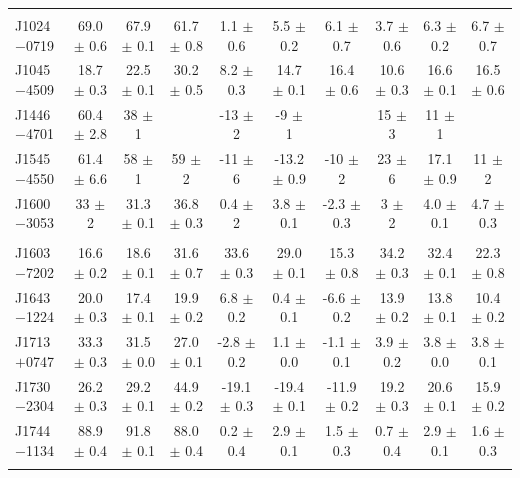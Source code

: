 \documentclass[useAMS,usenatbib]{mn2e}
\begin{document}
\begin{table}
\begin{center}
\begin{tabular}{lccccccccc}
            &               &                &               &                &                &                &                &                &                \\
J1024$-$0719& 69.0 $\pm$ 0.6& 67.9 $\pm $ 0.1& 61.7 $\pm$ 0.8& 1.1  $\pm$ 0.6 &  5.5 $\pm$ 0.2 & 6.1  $\pm$ 0.7 &  3.7 $\pm$ 0.6 &  6.3 $\pm$ 0.2 & 6.7  $\pm$ 0.7 \\
J1045$-$4509& 18.7 $\pm$ 0.3& 22.5 $\pm $ 0.1& 30.2 $\pm$ 0.5& 8.2  $\pm$ 0.3 & 14.7 $\pm$ 0.1 & 16.4 $\pm$ 0.6 & 10.6 $\pm$ 0.3 & 16.6 $\pm$ 0.1 & 16.5 $\pm$ 0.6 \\
J1446$-$4701& 60.4 $\pm$ 2.8& 38   $\pm $ 1  &               & -13  $\pm$ 2   & -9   $\pm$ 1   &                &  15  $\pm$ 3   &   11 $\pm$ 1   &                \\
J1545$-$4550& 61.4 $\pm$ 6.6& 58   $\pm $ 1  & 59   $\pm$ 2  & -11  $\pm$ 6   &-13.2 $\pm$ 0.9 & -10  $\pm$ 2   &   23 $\pm$ 6   & 17.1 $\pm$ 0.9 & 11   $\pm$ 2 \\
J1600$-$3053& 33   $\pm$ 2  & 31.3 $\pm $ 0.1& 36.8 $\pm$ 0.3& 0.4  $\pm$ 2   &  3.8 $\pm$ 0.1 & -2.3 $\pm$ 0.3 &    3 $\pm$ 2   &  4.0 $\pm$ 0.1 & 4.7  $\pm$ 0.3 \\
            &               &                &               &                &                &                &                &                &       \\
J1603$-$7202& 16.6 $\pm$ 0.2& 18.6 $\pm $ 0.1& 31.6 $\pm$ 0.7&33.6  $\pm$ 0.3 & 29.0 $\pm$ 0.1 & 15.3 $\pm$ 0.8 & 34.2 $\pm$ 0.3 & 32.4 $\pm$ 0.1 & 22.3 $\pm$ 0.8 \\
J1643$-$1224& 20.0 $\pm$ 0.3& 17.4 $\pm $ 0.1& 19.9 $\pm$ 0.2& 6.8  $\pm$ 0.2 &  0.4 $\pm$ 0.1 & -6.6 $\pm$ 0.2 & 13.9 $\pm$ 0.2 & 13.8 $\pm$ 0.1 & 10.4 $\pm$ 0.2 \\
J1713$+$0747& 33.3 $\pm$ 0.3& 31.5 $\pm $ 0.0& 27.0 $\pm$ 0.1&-2.8  $\pm$ 0.2 &  1.1 $\pm$ 0.0 & -1.1 $\pm$ 0.1 &  3.9 $\pm$ 0.2 &  3.8 $\pm$ 0.0 & 3.8  $\pm$ 0.1 \\
J1730$-$2304& 26.2 $\pm$ 0.3& 29.2 $\pm $ 0.1& 44.9 $\pm$ 0.2&-19.1 $\pm$ 0.3 &-19.4 $\pm$ 0.1 &-11.9 $\pm$ 0.2 & 19.2 $\pm$ 0.3 & 20.6 $\pm$ 0.1 & 15.9 $\pm$ 0.2 \\
J1744$-$1134& 88.9 $\pm$ 0.4& 91.8 $\pm $ 0.1& 88.0 $\pm$ 0.4& 0.2  $\pm$ 0.4 &  2.9 $\pm$ 0.1 &  1.5 $\pm$ 0.3 &  0.7 $\pm$ 0.4 &  2.9 $\pm$ 0.1 & 1.6  $\pm$ 0.3 \\
            &               &                &               &                &                &                &                &                &               \\

\end{tabular}
\end{center}
\end{table}
\end{document}
